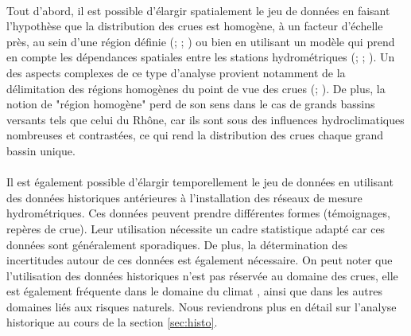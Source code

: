 	\paragraph{} Tout d'abord, il est possible d'élargir spatialement le jeu de données en faisant l'hypothèse que la distribution des crues est homogène, à un facteur d'échelle près, au sein d'une région définie (\cite{hosking_regional_1997}; \cite{gaume_bayesian_2010}; \cite{viglione_flood_2013}) ou bien en utilisant un modèle qui prend en compte les dépendances spatiales entre les stations hydrométriques (\cite{kjeldsen_exploratory_2009}; \cite{renard_bayesian_2011}; \cite{sun_general_2014}). Un des aspects complexes de ce type d'analyse provient notamment de la délimitation des régions homogènes du point de vue des crues (\cite{ouarda_regional_2001}; \cite{han_network_2020}). De plus, la notion de "région homogène" perd de son sens dans le cas de grands bassins versants tels que celui du Rhône, car ils sont sous des influences hydroclimatiques nombreuses et contrastées, ce qui rend la distribution des crues chaque grand bassin unique.
	
	\paragraph{} Il est également possible d'élargir temporellement le jeu de données en utilisant des données historiques antérieures à l'installation des réseaux de mesure hydrométriques. Ces données peuvent prendre différentes formes (témoignages, repères de crue). Leur utilisation nécessite un cadre statistique adapté car ces données sont généralement sporadiques. De plus, la détermination des incertitudes autour de ces données est également nécessaire. On peut noter que l'utilisation des données historiques n'est pas réservée au domaine des crues, elle est également fréquente dans le domaine du climat \citep{ribes_making_2021}, ainsi que dans les autres domaines liés aux risques naturels. Nous reviendrons plus en détail sur l'analyse historique au cours de la section \ref{sec:histo}.
	
